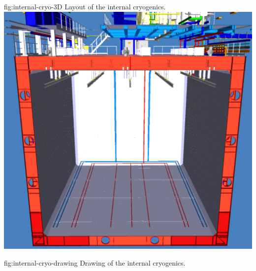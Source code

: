 \begin{dunefigure}{fig:internal-cryo-3D}
  {Layout of the internal cryogenics.}
\includegraphics[width=.98\textwidth]{graphics/Internal-Piping-3D.pdf}
\end{dunefigure}

\begin{dunefigure}{fig:internal-cryo-drawing}
  {Drawing of the internal cryogenics.}
\end{dunefigure}
